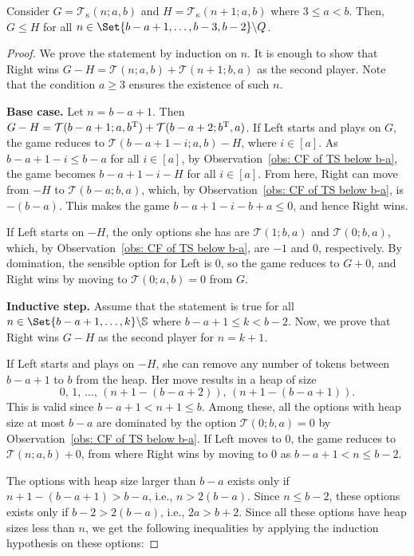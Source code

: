 \documentclass[oneside,reqno]{amsart}
\newcommand{\ts}{\mathcal{T}}
\begin{document}
\begin{proposition}\label{prop: domination at b-a}
Consider $G=\ts_{\kappa}(n;a,b)$ and $H=\ts_{\kappa}(n+1;a,b)$ where $3\le a<b$. Then, $G\le H$ for all $n\in \Set{b-a+1,\dots,b-3,b-2}\backslash Q$.
\end{proposition}
\iffalse\begin{proof}
    We prove the statement by induction on $n$. It is enough to show that Right wins $G-H=\ts(n;a,b)+\ts(n+1;b,a)$ as the second player. Note that the condition $a\ge 3$ ensures the existence of such $n$.

    \textbf{Base case.} Let $n=b-a+1$. Then $G-H=\ts(b-a+1;a,b^{\rm T})+\ts(b-a+2;b^{\rm T},a)$. If Left starts and plays on $G$, the game reduces to $\ts(b-a+1-i;a,b)-H$, where $i\in[a]$. As $b-a+1-i\leq b-a$ for all $i\in[a]$, by Observation~\ref{obs: CF of TS below b-a}, the game becomes $b-a+1-i-H$ for all $i\in[a]$. From here, Right can move from $-H$ to $\ts(b-a;b,a)$, which, by Observation~\ref{obs: CF of TS below b-a}, is $-(b-a)$. This makes the game $b-a+1-i-b+a\le 0$, and hence Right wins. 
    
    If Left starts on $-H$, the only options she has are $\ts(1;b,a)$ and $\ts(0;b,a)$, which, by Observation~\ref{obs: CF of TS below b-a}, are $-1$ and 0, respectively. By domination, the sensible option for Left is 0, so the game reduces to $G+0$, and Right wins by moving to $\ts(0;a,b)=0$ from $G$.

    \textbf{Inductive step.} Assume that the statement is true for all $n\in \Set{b-a+1,\dots,k}\backslash\mathbb S$ where $b-a+1\le k<b-2$. Now, we prove that Right wins $G-H$ as the second player for $n=k+1$. 
    
    If Left starts and plays on $-H$, she can remove any number of tokens between $b-a+1$ to $b$ from the heap. Her move results in a heap of size
    $$0,\,1,\,\dots,\,(n+1-(b-a+2)),\,(n+1-(b-a+1)).$$ This is valid since $b-a+1<n+1\le b$. Among these, all the options with heap size at most $b-a$ are dominated by the option $\ts(0;b,a)=0$ by Observation~\ref{obs: CF of TS below b-a}. If Left moves to 0, the game reduces to $\ts(n;a,b)+0$, from where Right wins by moving to 0 as $b-a+1< n\le b-2$.
    
    The options with heap size larger than $b-a$ exists only if $n+1-(b-a+1)>b-a$, i.e., $n>2(b-a)$. Since $n\le b-2$, these options exists only if $b-2>2(b-a)$, i.e., $2a>b+2$. Since all these options have heap sizes less than $n$, we get the following inequalities by applying the induction hypothesis on these options:


\end{proof}
\end{document}
